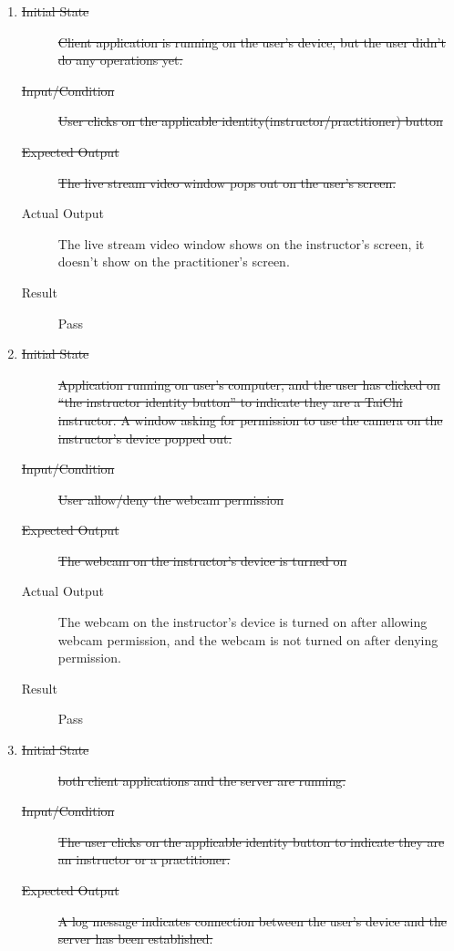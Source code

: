 \documentclass[12pt, titlepage]{article}
\begin{document}
\begin{enumerate}[FR-T1]
\item \label{FRT1}
  \begin{description}
  \item[\sout{Initial State}] \sout{Client application is running on the user's
      device, but the user didn’t do any operations yet.}
  \item[\sout{Input/Condition}] \sout{User clicks on the applicable
      identity(instructor/practitioner) button}
  \item[\sout{Expected Output}] \sout{The live stream video window pops out on
      the user's screen.}
  \item[Actual Output] The live stream video window shows on the instructor's
    screen, it doesn't show on the practitioner's screen.
  \item[Result] Pass
  \end{description}
\item \label{FRT2}
  \begin{description}
  \item[\sout{Initial State}] \sout{Application running on user’s computer, and
      the user has clicked on “the instructor identity button” to indicate
      they are a TaiChi instructor. A window asking for permission to use the
      camera on the instructor's device popped out.}
  \item[\sout{Input/Condition}] \sout{User allow/deny the webcam permission}
  \item[\sout{Expected Output}] \sout{The webcam on the instructor’s device is
      turned on}
  \item[Actual Output] The webcam on the instructor’s device is turned on after
    allowing webcam permission, and the webcam is not turned on after denying
    permission.
  \item[Result] Pass
  \end{description}
\item \label{FRT3}
  \begin{description}
  \item[\sout{Initial State}] \sout{both client applications and the server are
      running.}
  \item[\sout{Input/Condition}] \sout{The user clicks on the applicable identity
      button to indicate they are an instructor or a practitioner.}
  \item[\sout{Expected Output}] \sout{A log message indicates connection between
      the user’s device and the server has been established.}

\end{description}
\end{enumerate}
\end{document}

